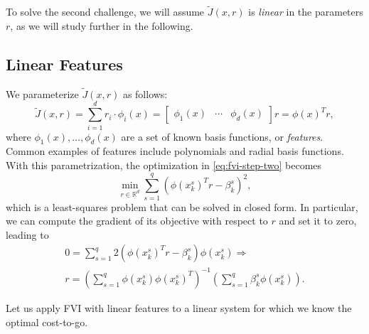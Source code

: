 \documentclass[
]{book}
\theoremstyle{definition}
\theoremstyle{definition}
\theoremstyle{definition}
\theoremstyle{definition}
\theoremstyle{remark}
\begin{document}
To solve the second challenge, we will assume \(\tilde{J}(x,r)\) is \emph{linear} in the parameters \(r\), as we will study further in the following.

\hypertarget{linear-features}{%
\subsection{Linear Features}\label{linear-features}}

We parameterize \(\tilde{J}(x,r)\) as follows:
\begin{equation}
\tilde{J}(x,r) = \sum_{i=1}^d r_i \cdot \phi_i(x) = \begin{bmatrix} \phi_1(x) & \cdots & \phi_d(x) \end{bmatrix} r = \phi(x)^T r,
\end{equation}
where \(\phi_1(x),\dots,\phi_d(x)\) are a set of known basis functions, or \emph{features}. Common examples of features include polynomials and radial basis functions.
With this parametrization, the optimization in \eqref{eq:fvi-step-two} becomes
\begin{equation}
\min_{r \in \mathbb{R}^d} \sum_{s=1}^q \left( \phi(x_k^s)^T r - \beta_k^s \right)^2,
\label{eq:fvi-step-two-least-squares}
\end{equation}
which is a least-squares problem that can be solved in closed form. In particular, we can compute the gradient of its objective with respect to \(r\) and set it to zero, leading to
\begin{align}
0 = \sum_{s=1}^q 2(\phi(x_k^s)^T r - \beta_k^s ) \phi(x_k^s)  \Longrightarrow \\
r = \left( \sum_{s=1}^q \phi(x_k^s) \phi(x_k^s)^T \right)^{-1} \left( \sum_{s=1}^q \beta_k^s \phi(x_k^s) \right).
\end{align}

Let us apply FVI with linear features to a linear system for which we know the optimal cost-to-go.
\end{document}
